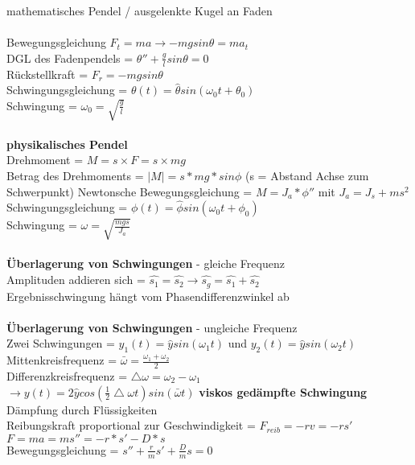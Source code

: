 \documentclass[8pt]{article}
\begin{document}
mathematisches Pendel / ausgelenkte Kugel an Faden \\ \\
\noindent
Bewegungsgleichung
$F_t = ma \rightarrow -mg sin\theta = ma_t $ \\
DGL des Fadenpendels = $\theta'' + \frac{g}{l} sin \theta = 0$ \\
Rückstellkraft = $F_r = -mg sin\theta$ \\
Schwingungsgleichung = $\theta(t) = \hat{\theta}sin(\omega_0 t +\theta_0)$ \\
Schwingung = $\omega_0 = \sqrt{\frac{g}{l}}$
\\ \\
\noindent
\textbf{physikalisches Pendel}\\ 
Drehmoment = $M = s \times F = s \times mg$ \\
Betrag des Drehmoments = $|M|=s*mg*sin\phi$ (s = Abstand Achse zum Schwerpunkt)
Newtonsche Bewegungsgleichung = $M = J_a * \phi'' $ mit $J_a = J_s + ms^2$\\
Schwingungsgleichung = $\phi(t) = \hat{\phi}sin(\omega_0 t +\phi_0)$ \\
Schwingung = $\omega = \sqrt{\frac{mgs}{J_a}}$
\\ \\
\noindent
\textbf{Überlagerung von Schwingungen} - gleiche Frequenz\\
Amplituden addieren sich = $\hat{s_1} = \hat{s_2} \rightarrow \hat{s_g} = \hat{s_1}+\hat{s_2}$ \\
Ergebnisschwingung hängt vom Phasendifferenzwinkel ab\\ \\
\noindent
\textbf{Überlagerung von Schwingungen} - ungleiche Frequenz\\
Zwei Schwingungen = $y_1(t) = \hat{y} sin(\omega_1 t)$ und $y_2(t) = \hat{y} sin(\omega_2 t)$\\
Mittenkreisfrequenz = $\bar{\omega} = \frac{\omega_1 + \omega_2}{2}$\\
Differenzkreisfrequenz = $\bigtriangleup\omega = \omega_2-\omega_1$ \\
$\rightarrow  y(t)=2\hat{y}cos(\frac{1}{2}\bigtriangleup\omega t)sin(\bar{\omega}t)$ 
\newpage
\noindent
\textbf{viskos gedämpfte Schwingung}\\
Dämpfung durch Flüssigkeiten\\
Reibungskraft proportional zur Geschwindigkeit = $F_{reib} = -rv = -r s'$
$F=ma=ms''=-r*s'-D*s$\\
Bewegungsgleichung = $s''+\frac{r}{m}s'+\frac{D}{m}s=0$ \\
\end{document}
